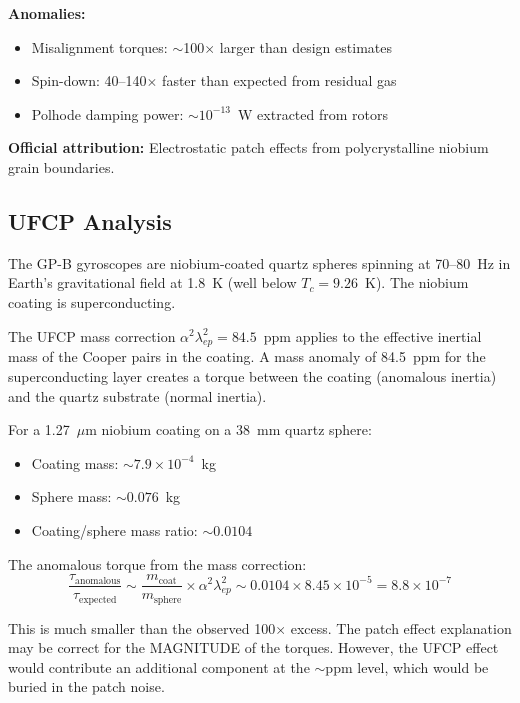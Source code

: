 \documentclass[11pt, a4paper]{article}
\begin{document}
\textbf{Anomalies:}
\begin{itemize}[nosep]
  \item Misalignment torques: $\sim$100$\times$ larger than
        design estimates
  \item Spin-down: 40--140$\times$ faster than expected from
        residual gas
  \item Polhode damping power: $\sim 10^{-13}$~W extracted
        from rotors
\end{itemize}

\textbf{Official attribution:} Electrostatic patch effects from
polycrystalline niobium grain boundaries.

\subsection{UFCP Analysis}

The GP-B gyroscopes are niobium-coated quartz spheres spinning
at 70--80~Hz in Earth's gravitational field at 1.8~K (well below
$T_c = 9.26$~K). The niobium coating is superconducting.

The UFCP mass correction $\alpha^2\lambda_{ep}^2 = 84.5$~ppm
applies to the effective inertial mass of the Cooper pairs in
the coating. A mass anomaly of 84.5~ppm for the superconducting
layer creates a torque between the coating (anomalous inertia)
and the quartz substrate (normal inertia).

For a 1.27~$\mu$m niobium coating on a 38~mm quartz sphere:
\begin{itemize}[nosep]
  \item Coating mass: $\sim 7.9 \times 10^{-4}$~kg
  \item Sphere mass: $\sim 0.076$~kg
  \item Coating/sphere mass ratio: $\sim 0.0104$
\end{itemize}

The anomalous torque from the mass correction:
\begin{equation}
  \frac{\tau_{\text{anomalous}}}{\tau_{\text{expected}}}
  \sim \frac{m_{\text{coat}}}{m_{\text{sphere}}}
  \times \alpha^2 \lambda_{ep}^2
  \sim 0.0104 \times 8.45 \times 10^{-5}
  = 8.8 \times 10^{-7}
\end{equation}

This is much smaller than the observed 100$\times$ excess.
The patch effect explanation may be correct for the MAGNITUDE
of the torques. However, the UFCP effect would contribute an
additional component at the $\sim$ppm level, which would be
buried in the patch noise.
\end{document}
